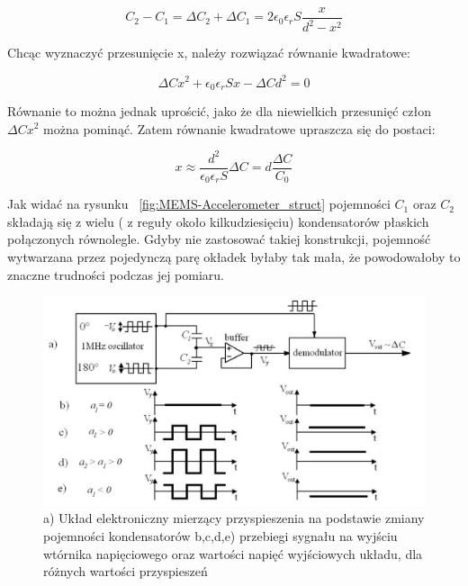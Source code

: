 \begin{equation}
	C_2 - C_1 = \Delta{C_2} + \Delta{C_1} = 2\epsilon_0\epsilon_rS\frac{x}{d^2 - x^2}
\end{equation}

Chcąc wyznaczyć przesunięcie x, należy rozwiązać równanie kwadratowe:

\begin{equation}
	\Delta{C}x^2 + \epsilon_0\epsilon_rSx - \Delta{C}d^2 = 0
\end{equation}

Równanie to można jednak uprościć, jako że dla niewielkich przesunięć człon $\Delta{C}x^2$ można pominąć. Zatem równanie kwadratowe upraszcza się do postaci:

\begin{equation}
	x \approx \frac{d^2}{\epsilon_0\epsilon_rS}\Delta{C} = d\frac{\Delta{C}}{C_0}
	\label{x_to_c}
\end{equation}

Jak widać na rysunku ~\ref{fig:MEMS-Accelerometer_struct} pojemności $C_1$ oraz $C_2$ składają się z wielu ( z reguły około kilkudziesięciu)  kondensatorów płaskich połączonych równolegle. Gdyby nie zastosować takiej konstrukcji, pojemność wytwarzana przez pojedynczą parę okładek byłaby tak mała, że powodowałoby to znaczne trudności podczas jej pomiaru. 

\begin{figure}[H]
	\centering
	\includegraphics[scale=0.4]{Pictures/MEMS_accel_demod.png}
		\caption[Układ elektroniczny do pomiaru różnicy pojemności kondensatorów]{a) Układ elektroniczny mierzący przyspieszenia na podstawie zmiany pojemności kondensatorów b,c,d,e) przebiegi sygnału na wyjściu wtórnika napięciowego oraz wartości napięć wyjściowych układu, dla różnych wartości przyspieszeń }
	\label{fig:MEMS_accel_demod}
\end{figure}

